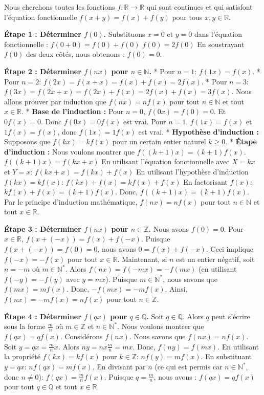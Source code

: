 \documentclass[12pt,a4paper]{report}
\begin{document}
Nous cherchons toutes les fonctions $f: \mathbb{R} \to \mathbb{R}$ qui sont continues et qui satisfont l'équation fonctionnelle $f(x+y) = f(x) + f(y)$ pour tous $x, y \in \mathbb{R}$.

\textbf{Étape 1 : Déterminer $f(0)$.}
Substituons $x=0$ et $y=0$ dans l'équation fonctionnelle :
$f(0+0) = f(0) + f(0)$
$f(0) = 2f(0)$
En soustrayant $f(0)$ des deux côtés, nous obtenons :
$f(0) = 0$.

\textbf{Étape 2 : Déterminer $f(nx)$ pour $n \in \mathbb{N}$.}
*   Pour $n=1$: $f(1x) = f(x)$.
*   Pour $n=2$: $f(2x) = f(x+x) = f(x) + f(x) = 2f(x)$.
*   Pour $n=3$: $f(3x) = f(2x+x) = f(2x) + f(x) = 2f(x) + f(x) = 3f(x)$.
Nous allons prouver par induction que $f(nx) = nf(x)$ pour tout $n \in \mathbb{N}$ et tout $x \in \mathbb{R}$.
*   \textbf{Base de l'induction :} Pour $n=0$, $f(0x) = f(0) = 0$. Et $0f(x) = 0$. Donc $f(0x) = 0f(x)$ est vrai. Pour $n=1$, $f(1x) = f(x)$ et $1f(x) = f(x)$, donc $f(1x) = 1f(x)$ est vrai.
*   \textbf{Hypothèse d'induction :} Supposons que $f(kx) = kf(x)$ pour un certain entier naturel $k \ge 0$.
*   \textbf{Étape d'induction :} Nous voulons montrer que $f((k+1)x) = (k+1)f(x)$.
    $f((k+1)x) = f(kx + x)$
    En utilisant l'équation fonctionnelle avec $X=kx$ et $Y=x$:
    $f(kx + x) = f(kx) + f(x)$
    En utilisant l'hypothèse d'induction $f(kx) = kf(x)$:
    $f(kx) + f(x) = kf(x) + f(x)$
    En factorisant $f(x)$:
    $kf(x) + f(x) = (k+1)f(x)$.
    Donc, $f((k+1)x) = (k+1)f(x)$.
Par le principe d'induction mathématique, $f(nx) = nf(x)$ pour tout $n \in \mathbb{N}$ et tout $x \in \mathbb{R}$.

\textbf{Étape 3 : Déterminer $f(nx)$ pour $n \in \mathbb{Z}$.}
Nous avons $f(0) = 0$.
Pour $x \in \mathbb{R}$, $f(x + (-x)) = f(x) + f(-x)$.
Puisque $f(x + (-x)) = f(0) = 0$, nous avons $0 = f(x) + f(-x)$.
Ceci implique $f(-x) = -f(x)$ pour tout $x \in \mathbb{R}$.
Maintenant, si $n$ est un entier négatif, soit $n = -m$ où $m \in \mathbb{N}^*$.
Alors $f(nx) = f(-mx) = -f(mx)$ (en utilisant $f(-y) = -f(y)$ avec $y=mx$).
Puisque $m \in \mathbb{N}^*$, nous savons que $f(mx) = mf(x)$.
Donc, $-f(mx) = -mf(x)$.
Ainsi, $f(nx) = -mf(x) = nf(x)$ pour tout $n \in \mathbb{Z}$.

\textbf{Étape 4 : Déterminer $f(qx)$ pour $q \in \mathbb{Q}$.}
Soit $q \in \mathbb{Q}$. Alors $q$ peut s'écrire sous la forme $\frac{m}{n}$ où $m \in \mathbb{Z}$ et $n \in \mathbb{N}^*$.
Nous voulons montrer que $f(qx) = qf(x)$.
Considérons $f(nx)$. Nous savons que $f(nx) = nf(x)$.
Soit $y = qx = \frac{m}{n}x$. Alors $ny = nx \frac{m}{n} = mx$.
Donc, $f(ny) = f(mx)$.
En utilisant la propriété $f(kx) = kf(x)$ pour $k \in \mathbb{Z}$:
$nf(y) = mf(x)$.
En substituant $y = qx$:
$nf(qx) = mf(x)$.
En divisant par $n$ (ce qui est permis car $n \in \mathbb{N}^*$, donc $n \neq 0$):
$f(qx) = \frac{m}{n}f(x)$.
Puisque $q = \frac{m}{n}$, nous avons :
$f(qx) = qf(x)$ pour tout $q \in \mathbb{Q}$ et tout $x \in \mathbb{R}$.
\end{document}
